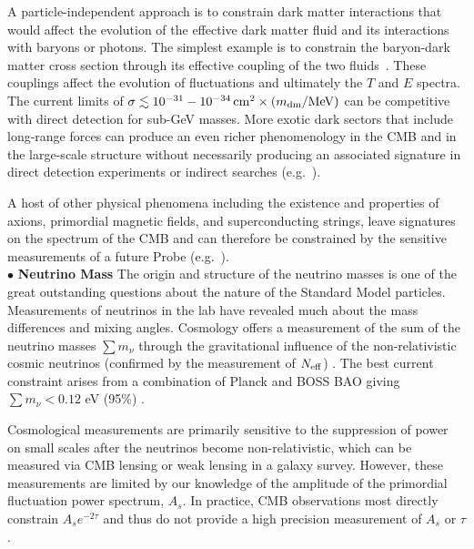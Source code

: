 \documentclass[PICOReport.tex]{subfiles}
\begin{document}
A particle-independent approach is to constrain dark matter interactions that would 
affect the evolution of the effective dark matter fluid and its interactions with baryons or photons.  The simplest example is 
to constrain the baryon-dark matter cross section through its effective coupling of the two fluids~\cite{Dvorkin:2013cea}.  
These couplings affect the evolution of fluctuations and ultimately the $T$ and $E$ spectra. 
The current limits of $\sigma \lesssim 10^{-31}-10^{-34}\,{\rm cm}^2 \times (m_{\rm dm} / {\rm MeV})$ can be 
competitive with direct detection for sub-GeV masses.  
More exotic dark sectors that include long-range forces can produce an even richer phenomenology in the CMB and in the large-scale structure 
without necessarily producing an associated signature in direct detection experiments or 
indirect searches (e.g.~\cite{Cyr-Racine:2013fsa,Buen-Abad:2015ova,Lesgourgues:2015wza}). 

A host of other physical phenomena including the existence and properties of axions, primordial magnetic fields, and 
superconducting strings, leave signatures on the spectrum of the CMB and can therefore be constrained by 
the sensitive measurements  of a future Probe (e.g.~\cite{Jedamzik2000, Tashiro2012, Dolgov2013, Tashiro2013, Caldwell2013}).
\\
 $\bullet$ {\bf Neutrino Mass} \hspace{0.1in} The origin and structure of the neutrino masses is one of the great outstanding 
 questions about the nature of the Standard Model particles.  Measurements of neutrinos in the lab have revealed much 
 about the mass differences and mixing angles.  Cosmology offers a 
 measurement of the sum of the neutrino masses $\sum m_\nu$ through the gravitational influence of the non-relativistic 
 cosmic neutrinos (confirmed by the measurement of ${N_{\rm eff}}$) .  
 The best current constraint arises from a combination of 
 Planck and BOSS \ac{BAO} giving $\sum m_\nu < 0.12$ eV (95\%) .

Cosmological measurements are primarily sensitive to the suppression of power on small scales after the neutrinos become 
non-relativistic, which can be measured via CMB lensing or weak lensing in a galaxy survey.  However, these measurements are 
limited by our knowledge of the amplitude of the primordial fluctuation power spectrum, $A_s$.  In practice, CMB observations most 
directly constrain $A_s e^{-2 \tau}$ 
and thus do not provide a high precision measurement of $A_s$ or $\tau$.  
\end{document}
